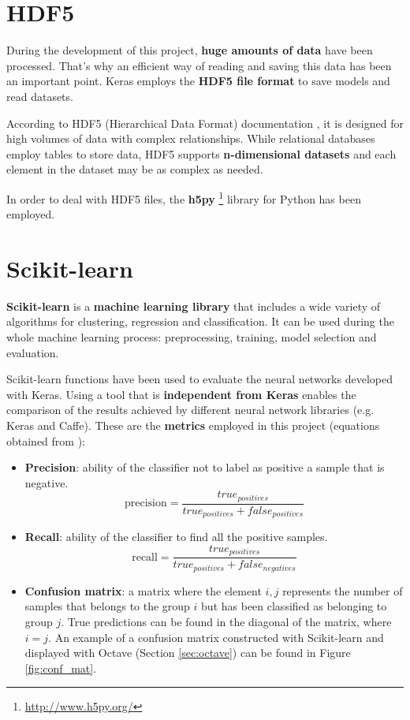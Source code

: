 \section{HDF5}\label{sec:hdf}
During the development of this project, \textbf{huge amounts of data} have been processed. That's why an efficient way of reading and saving this data has been an important point. Keras employs the \textbf{HDF5 file format} to save models and read datasets.

According to HDF5 (Hierarchical Data Format) documentation \cite{hdf5}, it is designed for high volumes of data with complex relationships. While relational databases employ tables to store data, HDF5 supports \textbf{n-dimensional datasets} and each element in the dataset may be as complex as needed.

In order to deal with HDF5 files, the \textbf{h5py} \footnote{\url{http://www.h5py.org/}} library for Python has been employed.

\section{Scikit-learn}\label{sec:sklearn}
\textbf{Scikit-learn} \cite{scikit-learn} is a \textbf{machine learning library} that includes a wide variety of algorithms for clustering, regression and classification. It can be used during the whole machine learning process: preprocessing, training, model selection and evaluation.

Scikit-learn functions have been used to evaluate the neural networks developed with Keras. Using a tool that is \textbf{independent from Keras} enables the comparison of the results achieved by different neural network libraries (e.g. Keras and Caffe). These are the \textbf{metrics} employed in this project (equations obtained from \cite{scikit-doc}):
\begin{itemize}
	\item \textbf{Precision}: ability of the classifier not to label as positive a sample that is negative.
	\begin{equation}\label{eq:precision}
	\textrm{precision}=\frac{true_{positives}}{true_{positives}+false_{positives}}
	\end{equation}
	
	\item \textbf{Recall}: ability of the classifier to find all the positive samples.
	\begin{equation}\label{eq:recall}
	\textrm{recall}=\frac{true_{positives}}{true_{positives}+false_{negatives}}
	\end{equation}
	
	\item \textbf{Confusion matrix}: a matrix where the element $i,j$ represents the number of samples that belongs to the group $i$ but has been classified as belonging to group $j$. True predictions can be found in the diagonal of the matrix, where $i=j$. An example of a confusion matrix constructed with Scikit-learn and displayed with Octave (Section \ref{sec:octave}) can be found in Figure \ref{fig:conf_mat}.
\end{itemize}

